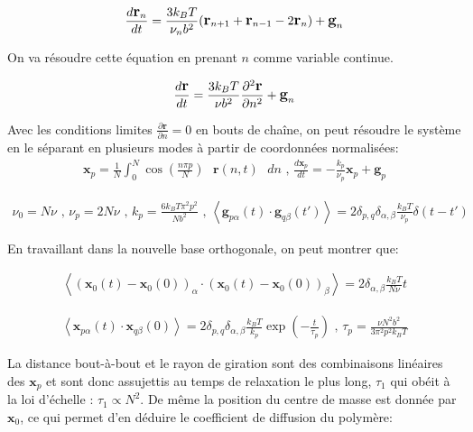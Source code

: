 \begin{eqnarray}
\large{
\frac{d \textbf{r}_n}{dt} =  \frac{3k_BT}{\nu_n b^2}( \textbf{r}_{n+1} +\textbf{r}_{n-1} -2\textbf{r}_n )  + \textbf{g}_n}
\end{eqnarray}

On va résoudre cette équation en prenant $n$ comme variable continue.

\begin{eqnarray}
\large{
\frac{d \textbf{r}}{dt} =  \frac{3k_BT}{\nu b^2}\frac{\partial ^2 \textbf{r}}{\partial  n^2} + \textbf{g}_n}
\end{eqnarray}

Avec les conditions limites $\frac{\partial  \textbf{r}}{\partial  n}=0$ en bouts de chaîne, on peut résoudre le système en le séparant en plusieurs modes à  partir de coordonnées normalisées: 
\begin{eqnarray}
\textbf{x}_p= \frac{1}{N} \int_0^N \cos \left(\frac{n\pi p}{N}\right) \text{ }\textbf{r}(n,t)\text{ } dn \text{ , } \frac{d \textbf{x}_p}{dt} =  -\frac{k_p}{\nu _p} \textbf{x}_p + \textbf{g}_p
\end{eqnarray}



\begin{eqnarray}
\nu_0=  N \nu \text{ , } \nu_p= 2 N \nu  \text{ , }  k_p=\frac{6k_BT\pi^2 p^2}{N b^2}  \text{ , }  \left<\textbf{g}_{p\alpha}(t) \cdot \textbf{g}_{q\beta}(t')\right> = 2\delta_{p,q} \delta_{\alpha ,\beta} \frac{k_BT}{\nu_p} \delta(t-t')
\end{eqnarray}

En travaillant dans la nouvelle base orthogonale, on peut montrer que:


\begin{eqnarray}
\left<(\textbf{x}_{0}(t)-\textbf{x}_{0}(0))_\alpha \cdot (\textbf{x}_{0}(t)-\textbf{x}_{0}(0))_\beta \right> = 2 \delta_{\alpha ,\beta} \frac{k_BT}{N\nu}t
\end{eqnarray}

\begin{eqnarray}
\left<\textbf{x}_{p\alpha}(t) \cdot \textbf{x}_{q\beta}(0)\right> = 2\delta_{p,q} \delta_{\alpha ,\beta} \frac{k_BT}{k_p} \exp\left(-\frac{t}{\tau_p}\right) \text{ , } \tau _p = \frac{\nu N^2 b^2}{3\pi^2p^2k_BT}
\end{eqnarray}

La distance bout-à-bout et le rayon de giration sont des combinaisons linéaires des $\textbf{x}_p$ et sont donc assujettis  au temps de relaxation le plus long, $\tau_1$ qui obéit à la loi d'échelle : $\tau_1 \propto N^2$. De même la position du centre de masse est donnée par $\textbf{x}_0$, ce qui permet d'en déduire le coefficient de diffusion du polymère:



